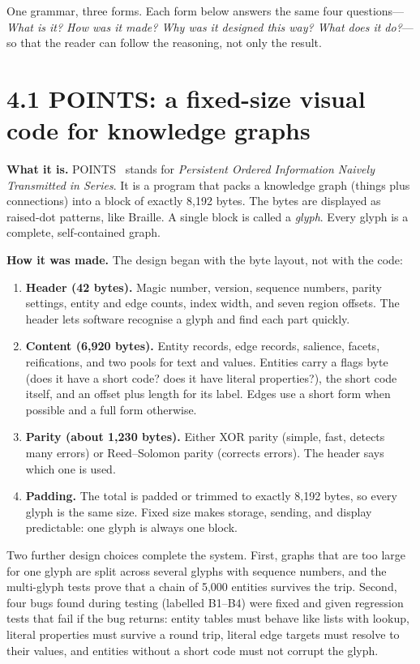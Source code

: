 \label{sec:instantiation}

One grammar, three forms. Each form below answers the same four questions---\textit{What is it? How was it made? Why was it designed this way? What does it do?}---so that the reader can follow the reasoning, not only the result.

\section*{4.1 POINTS: a fixed-size visual code for knowledge graphs}

\textbf{What it is.} POINTS~\cite{points2026} stands for \textit{Persistent Ordered Information Naively Transmitted in Series}. It is a program that packs a knowledge graph (things plus connections) into a block of exactly 8,192 bytes. The bytes are displayed as raised-dot patterns, like Braille. A single block is called a \textit{glyph}. Every glyph is a complete, self-contained graph.

\textbf{How it was made.} The design began with the byte layout, not with the code:

\begin{enumerate}
\item \textbf{Header (42 bytes).} Magic number, version, sequence numbers, parity settings, entity and edge counts, index width, and seven region offsets. The header lets software recognise a glyph and find each part quickly.
\item \textbf{Content (6,920 bytes).} Entity records, edge records, salience, facets, reifications, and two pools for text and values. Entities carry a flags byte (does it have a short code? does it have literal properties?), the short code itself, and an offset plus length for its label. Edges use a short form when possible and a full form otherwise.
\item \textbf{Parity (about 1,230 bytes).} Either XOR parity (simple, fast, detects many errors) or Reed--Solomon parity (corrects errors). The header says which one is used.
\item \textbf{Padding.} The total is padded or trimmed to exactly 8,192 bytes, so every glyph is the same size. Fixed size makes storage, sending, and display predictable: one glyph is always one block.
\end{enumerate}

Two further design choices complete the system. First, graphs that are too large for one glyph are split across several glyphs with sequence numbers, and the multi-glyph tests prove that a chain of 5,000 entities survives the trip. Second, four bugs found during testing (labelled B1--B4) were fixed and given regression tests that fail if the bug returns: entity tables must behave like lists with lookup, literal properties must survive a round trip, literal edge targets must resolve to their values, and entities without a short code must not corrupt the glyph.

